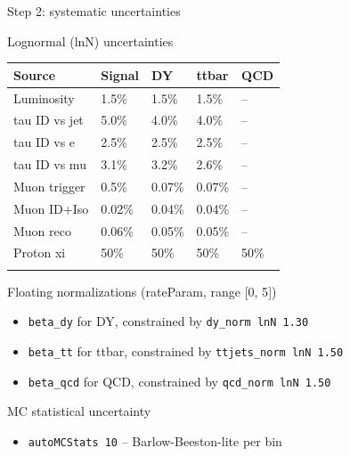 \begin{frame}[fragile]{Step 2: systematic uncertainties}
\protect{}\label{step-2-systematic-uncertainties}
\begin{block}{Lognormal (lnN) uncertainties}
\protect{}\label{lognormal-lnn-uncertainties}
\begin{longtable}[]{@{}lllll@{}}
\toprule\noalign{}
Source & Signal & DY & ttbar & QCD \\
\midrule\noalign{}
\endhead
Luminosity & 1.5\% & 1.5\% & 1.5\% & -- \\
tau ID vs jet & 5.0\% & 4.0\% & 4.0\% & -- \\
tau ID vs e & 2.5\% & 2.5\% & 2.5\% & -- \\
tau ID vs mu & 3.1\% & 3.2\% & 2.6\% & -- \\
Muon trigger & 0.5\% & 0.07\% & 0.07\% & -- \\
Muon ID+Iso & 0.02\% & 0.04\% & 0.04\% & -- \\
Muon reco & 0.06\% & 0.05\% & 0.05\% & -- \\
Proton xi & 50\% & 50\% & 50\% & 50\% \\
\bottomrule\noalign{}
\end{longtable}
\end{block}

\begin{block}{Floating normalizations (rateParam, range {[}0, 5{]})}
\protect{}\label{floating-normalizations-rateparam-range-0-5}
\begin{itemize}
\tightlist
\item
  \texttt{beta\_dy} for DY, constrained by \texttt{dy\_norm\ lnN\ 1.30}
\item
  \texttt{beta\_tt} for ttbar, constrained by
  \texttt{ttjets\_norm\ lnN\ 1.50}
\item
  \texttt{beta\_qcd} for QCD, constrained by
  \texttt{qcd\_norm\ lnN\ 1.50}
\end{itemize}
\end{block}

\begin{block}{MC statistical uncertainty}
\protect{}\label{mc-statistical-uncertainty}
\begin{itemize}
\tightlist
\item
  \texttt{autoMCStats\ 10} -- Barlow-Beeston-lite per bin
\end{itemize}
\end{block}
\end{frame}

